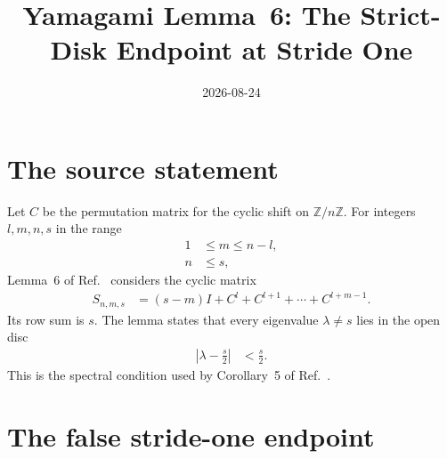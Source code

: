 \documentclass[11pt]{article}
\title{Yamagami Lemma~6: The Strict-Disk Endpoint at Stride One}
\author{}
\date{2026-08-24}
\begin{document}
\maketitle
{}

\section{The source statement}

Let $C$ be the permutation matrix for the cyclic shift on
$\mathbb Z/n\mathbb Z$. For integers $l,m,n,s$ in the range
\begin{align}
    1
        &\leq m
        \leq n-l,
    \label{eq:yamagami93_lemma6_endpoint_parameter_range_m}\\
    n
        &\leq s,
    \label{eq:yamagami93_lemma6_endpoint_parameter_range_s}
\end{align}
Lemma~6 of Ref.~\cite{Yamagami1993Cyclic} considers the cyclic matrix
\begin{align}
    S_{n,m,s}
        &=
        (s-m)I+C^l+C^{l+1}+\cdots+C^{l+m-1}.
    \label{eq:yamagami93_lemma6_endpoint_cyclic_matrix}
\end{align}
Its row sum is $s$. The lemma states that every eigenvalue $\lambda\neq s$
lies in the open disc
\begin{align}
    \left|\lambda-\frac{s}{2}\right|
        &< \frac{s}{2}.
    \label{eq:yamagami93_lemma6_endpoint_open_disk}
\end{align}
This is the spectral condition used by Corollary~5 of
Ref.~\cite[pp.~523--524]{Yamagami1993Cyclic}.

\section{The false stride-one endpoint}
\end{document}
